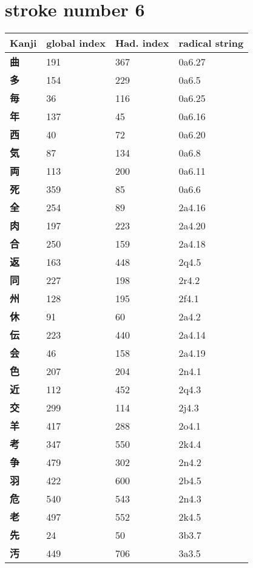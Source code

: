 \section{stroke number 6}
  \begin{longtable}[c]{llll}
    \bfseries Kanji & \bfseries global index & \bfseries Had. index & \bfseries radical string\\\hline\endhead
    \bfseries 曲 & 191 & 367 & 0a6.27\\
    \bfseries 多 & 154 & 229 & 0a6.5\\
    \bfseries 毎 & 36 & 116 & 0a6.25\\
    \bfseries 年 & 137 & 45 & 0a6.16\\
    \bfseries 西 & 40 & 72 & 0a6.20\\
    \bfseries 気 & 87 & 134 & 0a6.8\\
    \bfseries 両 & 113 & 200 & 0a6.11\\
    \bfseries 死 & 359 & 85 & 0a6.6\\
    \bfseries 全 & 254 & 89 & 2a4.16\\
    \bfseries 肉 & 197 & 223 & 2a4.20\\
    \bfseries 合 & 250 & 159 & 2a4.18\\
    \bfseries 返 & 163 & 448 & 2q4.5\\
    \bfseries 同 & 227 & 198 & 2r4.2\\
    \bfseries 州 & 128 & 195 & 2f4.1\\
    \bfseries 休 & 91 & 60 & 2a4.2\\
    \bfseries 伝 & 223 & 440 & 2a4.14\\
    \bfseries 会 & 46 & 158 & 2a4.19\\
    \bfseries 色 & 207 & 204 & 2n4.1\\
    \bfseries 近 & 112 & 452 & 2q4.3\\
    \bfseries 交 & 299 & 114 & 2j4.3\\
    \bfseries 羊 & 417 & 288 & 2o4.1\\
    \bfseries 考 & 347 & 550 & 2k4.4\\
    \bfseries 争 & 479 & 302 & 2n4.2\\
    \bfseries 羽 & 422 & 600 & 2b4.5\\
    \bfseries 危 & 540 & 543 & 2n4.3\\
    \bfseries 老 & 497 & 552 & 2k4.5\\
    \bfseries 先 & 24 & 50 & 3b3.7\\
    \bfseries 汚 & 449 & 706 & 3a3.5\\

\end{longtable}

